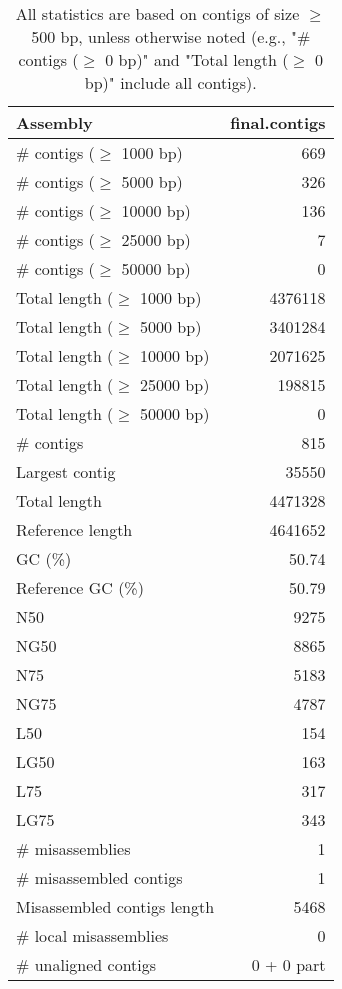 \documentclass[12pt,a4paper]{article}
\begin{document}
\begin{table}[ht]
\begin{center}
\caption{All statistics are based on contigs of size $\geq$ 500 bp, unless otherwise noted (e.g., "\# contigs ($\geq$ 0 bp)" and "Total length ($\geq$ 0 bp)" include all contigs).}
\begin{tabular}{|l*{1}{|r}|}
\hline
Assembly & final.contigs \\ \hline
\# contigs ($\geq$ 1000 bp) & 669 \\ \hline
\# contigs ($\geq$ 5000 bp) & 326 \\ \hline
\# contigs ($\geq$ 10000 bp) & 136 \\ \hline
\# contigs ($\geq$ 25000 bp) & 7 \\ \hline
\# contigs ($\geq$ 50000 bp) & 0 \\ \hline
Total length ($\geq$ 1000 bp) & 4376118 \\ \hline
Total length ($\geq$ 5000 bp) & 3401284 \\ \hline
Total length ($\geq$ 10000 bp) & 2071625 \\ \hline
Total length ($\geq$ 25000 bp) & 198815 \\ \hline
Total length ($\geq$ 50000 bp) & 0 \\ \hline
\# contigs & 815 \\ \hline
Largest contig & 35550 \\ \hline
Total length & 4471328 \\ \hline
Reference length & 4641652 \\ \hline
GC (\%) & 50.74 \\ \hline
Reference GC (\%) & 50.79 \\ \hline
N50 & 9275 \\ \hline
NG50 & 8865 \\ \hline
N75 & 5183 \\ \hline
NG75 & 4787 \\ \hline
L50 & 154 \\ \hline
LG50 & 163 \\ \hline
L75 & 317 \\ \hline
LG75 & 343 \\ \hline
\# misassemblies & 1 \\ \hline
\# misassembled contigs & 1 \\ \hline
Misassembled contigs length & 5468 \\ \hline
\# local misassemblies & 0 \\ \hline
\# unaligned contigs & 0 + 0 part \\ \hline

\end{tabular}
\end{center}
\end{table}
\end{document}

